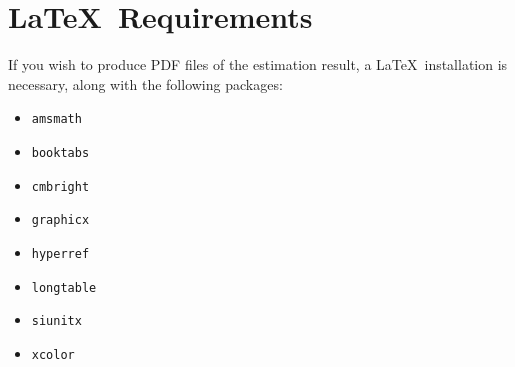 \documentclass[12pt]{article}
\begin{document}
\section{\LaTeX\ Requirements}
If you wish to produce PDF files of the estimation result, a \LaTeX\ installation is necessary, along with the following packages:
\begin{itemize}[leftmargin=*]
  \item \texttt{amsmath}
  \item \texttt{booktabs}
  \item \texttt{cmbright}
  \item \texttt{graphicx}
  \item \texttt{hyperref}
  \item \texttt{longtable}
  \item \texttt{siunitx}
  \item \texttt{xcolor}
\end{itemize}
\end{document}
